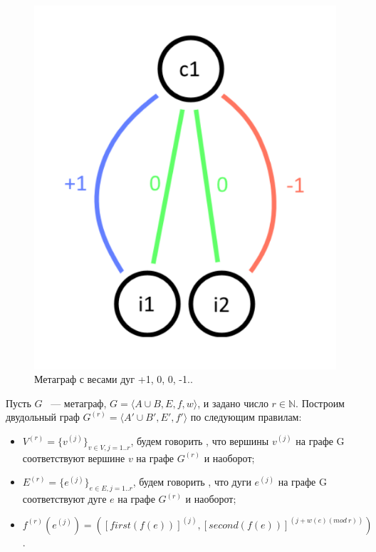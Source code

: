 \documentclass[14pt]{mmcs-article}
\begin{document}
\begin{figure}[H]
    \centering
    \includegraphics[scale=0.4]{Fig_2.png}
    \caption{ Метаграф с весами дуг +1, 0, 0, -1.. }
    \label{image:2}
\end{figure}

Пусть $G$ ~--- метаграф, $G = \langle A \cup B,E,f,w \rangle$, и задано число $r \in \mathbb{N}$. Построим двудольный граф $G^{(r)} = \langle A' \cup B',E',f' \rangle$ по следующим правилам:

\begin{itemize}
    \item $V^{(r)} = \{ v^{(j)} \}_{v \in V, j = 1..r}$,
    будем говорить , что вершины $v^{(j)}$ на графе G соответствуют вершине $v$ на графе $G^{(r)}$ и наоборот;
    \item $E^{(r)} = \{ e^{(j)} \}_{e \in E, j = 1..r}$,
    будем говорить , что дуги $e^{(j)}$ на графе G соответствуют дуге $e$ на графе $G^{(r)}$ и наоборот;
    \item $f^{(r)}(e^{(j)}) = ([first(f(e))]^{(j)}, [second(f(e))]^{(j + w(e) (mod \ r))})$.
\end{itemize}
\end{document}
